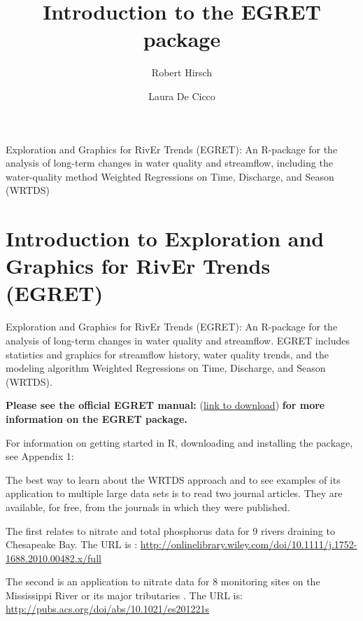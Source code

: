 \documentclass[a4paper,11pt]{article}\usepackage{graphicx, color}
\begin{document}
\title{Introduction to the EGRET package}
\author[1]{Robert Hirsch}
\author[1]{Laura De Cicco}

\maketitle

Exploration and Graphics for RivEr Trends (EGRET): An R-package for the analysis of long-term changes in water quality and streamflow, including the water-quality method Weighted Regressions on Time, Discharge, and Season (WRTDS)

\tableofcontents

\section{Introduction to Exploration and Graphics for RivEr Trends (EGRET)}

Exploration and Graphics for RivEr Trends (EGRET): An R-package for the analysis of long-term changes in water quality and streamflow. EGRET includes statistics and graphics for streamflow history, water quality trends, and the modeling algorithm Weighted Regressions on Time, Discharge, and Season (WRTDS). 


\textbf{Please see the official EGRET manual:}
(\href{https://github.com/USGS-R/EGRET/raw/Documentation/EGRET%2Bmanual_4.doc}{link to download}) 
\textbf{for more information on the EGRET package.}

For information on getting started in R, downloading and installing the package, see Appendix 1:

The best way to learn about the WRTDS approach and to see examples of its application to multiple large data sets is to read two journal articles.  They are available, for free, from the journals in which they were published.

The first relates to nitrate and total phosphorus data for 9 rivers draining to Chesapeake Bay.  The URL is \cite{HirschII}: 
\url{http://onlinelibrary.wiley.com/doi/10.1111/j.1752-1688.2010.00482.x/full}

The second is an application  to nitrate data for 8 monitoring sites on the Mississippi River or its major tributaries \cite{HirschIII}.  The URL is: \url{http://pubs.acs.org/doi/abs/10.1021/es201221s}
\end{document}
